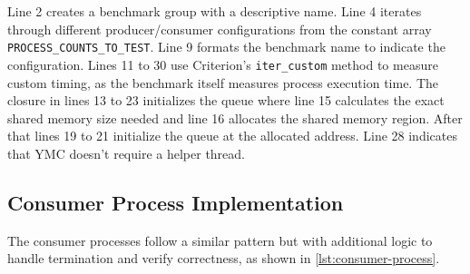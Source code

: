 Line 2 creates a benchmark group with a descriptive name. Line 4 iterates through different producer/consumer configurations from the constant array \texttt{PROCESS\_COUNTS\_TO\_TEST}. Line 9 formats the benchmark name to indicate the configuration. Lines 11 to 30 use Criterion's \texttt{iter\_custom} method to measure custom timing, as the benchmark itself measures process execution time. The closure in lines 13 to 23 initializes the queue where line 15 calculates the exact shared memory size needed and line 16 allocates the shared memory region. After that lines 19 to 21 initialize the queue at the allocated address. Line 28 indicates that \ac{YMC} doesn't require a helper thread.

\subsection{Consumer Process Implementation}
The consumer processes follow a similar pattern but with additional logic to handle termination and verify correctness, as shown in \cref{lst:consumer-process}.

